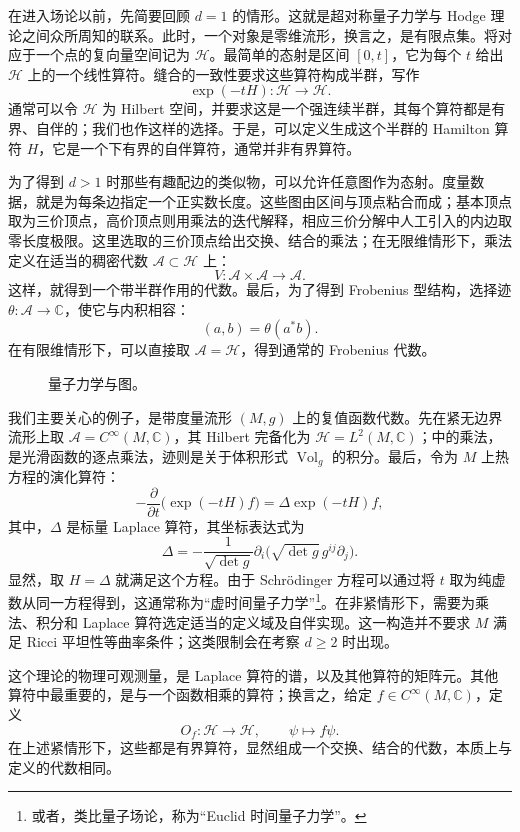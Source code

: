 在进入场论以前，先简要回顾 $d=1$ 的情形。这就是超对称量子力学与 Hodge 理论之间众所周知的联系。此时，一个对象是零维流形，换言之，是有限点集。将对应于一个点的复向量空间记为 $\mathcal{H}$。最简单的态射是区间 $[0,t]$，它为每个 $t$ 给出 $\mathcal{H}$ 上的一个线性算符。缝合的一致性要求这些算符构成半群，写作
\begin{equation}\label{eq:3.1}
\exp(-tH)\colon\mathcal{H}\longrightarrow\mathcal{H}.
\end{equation}
通常可以令 $\mathcal{H}$ 为 Hilbert 空间，并要求这是一个强连续半群，其每个算符都是有界、自伴的；我们也作这样的选择。于是，可以定义生成这个半群的 Hamilton 算符 $H$，它是一个下有界的自伴算符，通常并非有界算符。

为了得到 $d>1$ 时那些有趣配边的类似物，可以允许任意图作为态射。度量数据，就是为每条边指定一个正实数长度。这些图由区间与顶点粘合而成；基本顶点取为三价顶点，高价顶点则用乘法的迭代解释，相应三价分解中人工引入的内边取零长度极限。这里选取的三价顶点给出交换、结合的乘法；在无限维情形下，乘法定义在适当的稠密代数 $\mathcal{A}\subset\mathcal{H}$ 上：
\begin{equation}\label{eq:3.2}
V\colon\mathcal{A}\times\mathcal{A}\longrightarrow\mathcal{A}.
\end{equation}
这样，就得到一个带半群作用的代数。最后，为了得到 Frobenius 型结构，选择迹 $\theta\colon\mathcal{A}\to\mathbb{C}$，使它与内积相容：
\[
(a,b)=\theta(a^*b).
\]
在有限维情形下，可以直接取 $\mathcal{A}=\mathcal{H}$，得到通常的 Frobenius 代数。
\begin{figure}[H]
\centering
{}
\caption{量子力学与图。}\label{fig:3.1}
\end{figure}

\begin{example*}
我们主要关心的例子，是带度量流形 $(M,g)$ 上的复值函数代数。先在紧无边界流形上取 $\mathcal{A}=C^\infty(M,\mathbb{C})$，其 Hilbert 完备化为 $\mathcal{H}=L^2(M,\mathbb{C})$；中的乘法，是光滑函数的逐点乘法，迹则是关于体积形式 $\operatorname{Vol}_g$ 的积分。最后，令为 $M$ 上热方程的演化算符：
\[
-\frac{\partial}{\partial t}\bigl(\exp(-tH)f\bigr)
=\Delta\exp(-tH)f,
\]
其中，$\Delta$ 是标量 Laplace 算符，其坐标表达式为
\[
\Delta=-\frac{1}{\sqrt{\det g}}\partial_i\bigl(\sqrt{\det g}\,g^{ij}\partial_j\bigr).
\]
显然，取 $H=\Delta$ 就满足这个方程。由于 Schrödinger 方程可以通过将 $t$ 取为纯虚数从同一方程得到，这通常称为“虚时间量子力学”\footnote{或者，类比量子场论，称为“Euclid 时间量子力学”。}。在非紧情形下，需要为乘法、积分和 Laplace 算符选定适当的定义域及自伴实现。这一构造并不要求 $M$ 满足 Ricci 平坦性等曲率条件；这类限制会在考察 $d\ge2$ 时出现。

这个理论的物理可观测量，是 Laplace 算符的谱，以及其他算符的矩阵元。其他算符中最重要的，是与一个函数相乘的算符；换言之，给定 $f\in C^\infty(M,\mathbb{C})$，定义
\[
O_f\colon\mathcal{H}\longrightarrow\mathcal{H},\qquad\psi\longmapsto f\psi.
\]
在上述紧情形下，这些都是有界算符，显然组成一个交换、结合的代数，本质上与定义的代数相同。
\end{example*}

